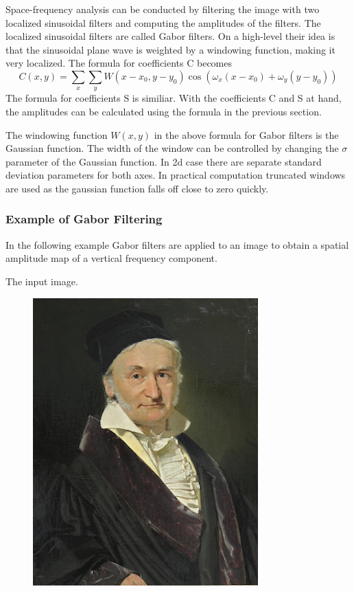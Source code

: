 \documentclass[]{article}
\begin{document}
Space-frequency analysis can be conducted by filtering the image with two
localized sinusoidal filters and computing the amplitudes of the filters. The
localized sinusoidal filters are called Gabor filters. On a high-level their
idea is that the sinusoidal plane wave is weighted by a windowing function,
making it very localized. The formula for coefficients C becomes
\begin{equation}
  C(x,y) = \sum_{x}{\sum_{y}{W(x-x_{0}, y-y_{0}) \cos(\omega_{x} (x - x_{0}) + \omega_{y} (y - y_{0})) }}
\end{equation}
The formula for coefficients S is similiar. With the coefficients C and S at
hand, the amplitudes can be calculated using the formula in the previous
section.

The windowing function $W(x,y)$ in the above formula for Gabor filters is the
Gaussian function. The width of the window can be controlled by changing the
$\sigma$ parameter of the Gaussian function. In 2d case there are separate
standard deviation parameters for both axes. In practical computation truncated
windows are used as the gaussian function falls off close to zero quickly.

\subsubsection{Example of Gabor Filtering}
\label{example-of-gabor-filtering}
In the following example Gabor filters are applied to an image to obtain a
spatial amplitude map of a vertical frequency component.

The input image.
\begin{figure}
    \includegraphics{input2.png}
\end{figure}
\end{document}
